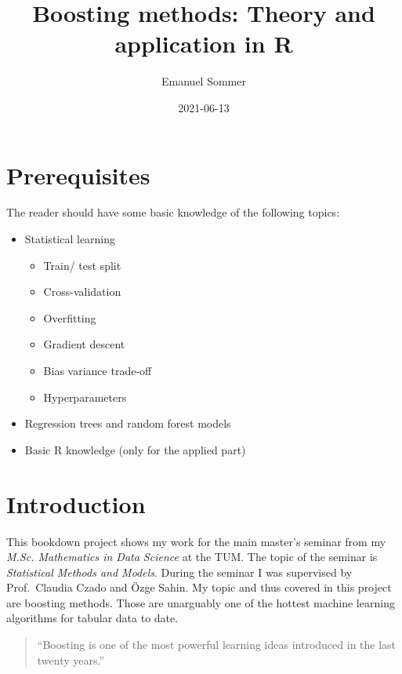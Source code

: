 \documentclass[
]{book}
\title{Boosting methods: Theory and application in R}
\author{Emanuel Sommer}
\date{2021-06-13}
\begin{document}
\maketitle

{
\setcounter{tocdepth}{1}
\tableofcontents
}
\hypertarget{prerequisites}{%
\chapter{Prerequisites}\label{prerequisites}}

The reader should have some basic knowledge of the following topics:

\begin{itemize}
\item
  Statistical learning

  \begin{itemize}
  \item
    Train/ test split
  \item
    Cross-validation
  \item
    Overfitting
  \item
    Gradient descent
  \item
    Bias variance trade-off
  \item
    Hyperparameters
  \end{itemize}
\item
  Regression trees and random forest models
\item
  Basic R knowledge (only for the applied part)
\end{itemize}

\hypertarget{intro}{%
\chapter{Introduction}\label{intro}}

This bookdown project shows my work for the main master's seminar from my \emph{M.Sc. Mathematics in Data Science} at the TUM. The topic of the seminar is \emph{Statistical Methods and Models}. During the seminar I was supervised by Prof.~Claudia Czado and Özge Sahin. My topic and thus covered in this project are boosting methods. Those are unarguably one of the hottest machine learning algorithms for tabular data to date.

\begin{quote}
``Boosting is one of the most powerful learning ideas introduced in the last
twenty years.'' \citep{elements}
\end{quote}
\end{document}
